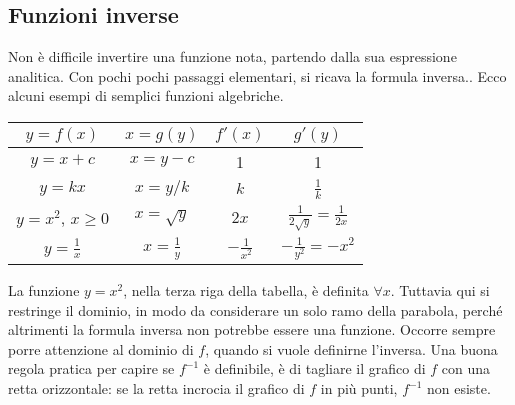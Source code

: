 \subsection{Funzioni inverse}
\label{subsec:diff01_derifuninverse}
Non è difficile invertire una funzione nota, partendo dalla sua espressione 
analitica.  Con pochi pochi passaggi elementari, si ricava la formula
inversa.. Ecco alcuni esempi di semplici funzioni algebriche.
\begin{center}
\begin{tabular}{|c|c|c|c|}
$y=f(x)$ & $x=g(y)$ & $f'(x)$ & $g'(y)$\\\hline
$y=x+c$ & $x=y-c$ & 1 & 1\\
$y=kx$ & $x=y/k$ & $k$ & $\frac{1}{k}$\\
$y=x^2$, $x\ge 0$ & $x=\sqrt{y}$ & $2x$ & $\frac{1}{2\sqrt{y}}=\frac{1}{2x}$\\
$y=\frac{1}{x}$ & $x=\frac{1}{y}$ & $-\frac{1}{x^2}$ & $-\frac{1}{y^2}=-x^2$\\
\hline
\end{tabular}
\end{center}

\begin{osservazione}
La funzione  $y=x^2$, nella terza riga della tabella, è definita $\forall x$.
Tuttavia qui si restringe il dominio, in modo da considerare un solo ramo della
parabola, perché altrimenti la formula inversa non potrebbe essere una funzione.
Occorre sempre porre attenzione al dominio di $f$, quando si vuole definirne 
l'inversa. Una buona regola pratica per capire se $f^{-1}$ è definibile, è di
tagliare il grafico di $f$ con una retta orizzontale: se la retta incrocia il 
grafico di $f$ in più punti, $f^{-1}$ non esiste.\\
\end{osservazione}

